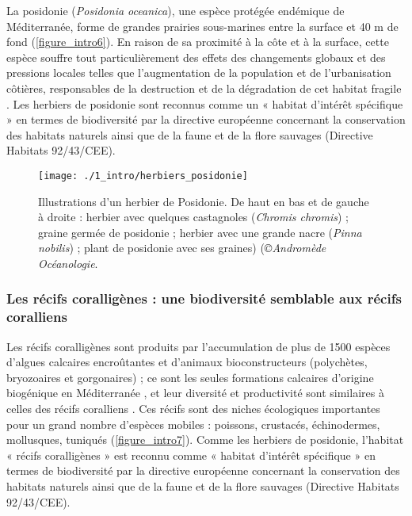 La posidonie (\textit{Posidonia oceanica}), une espèce protégée endémique de Méditerranée, forme de grandes prairies sous-marines entre la surface et 40 m de fond (\autoref{figure_intro6}). En raison de sa proximité à la côte et à la surface, cette espèce souffre tout particulièrement des effets des changements globaux \citep{marba_mediterranean_2014} et des pressions locales telles que l’augmentation de la population et de l’urbanisation côtières, responsables de la destruction et de la dégradation de cet habitat fragile \citep{montefalcone_human_2010, marba_mediterranean_2014, holon_impact_2015, telesca_seagrass_2015}. Les herbiers de posidonie sont reconnus comme un « habitat d’intérêt spécifique » en termes de biodiversité par la directive européenne concernant la conservation des habitats naturels ainsi que de la faune et de la flore sauvages (Directive Habitats 92/43/CEE).

\begin{figure}[H]
	\begin{center}
	\texttt{[image: ./1\_intro/herbiers\_posidonie]}
		\caption[Illustrations d’un herbier de Posidonie]{Illustrations d’un herbier de Posidonie. De haut en bas et de gauche à droite : herbier avec quelques castagnoles (\textit{Chromis chromis}) ; graine germée de posidonie ; herbier avec une grande nacre (\textit{Pinna nobilis}) ; plant de posidonie avec ses graines) (\textit{©Andromède Océanologie}.}
	\label{figure_intro6}
\end{center}
\end{figure}

\subsubsection{Les récifs coralligènes : une biodiversité semblable aux récifs coralliens}\label{intro.1.3.2}

Les récifs coralligènes sont produits par l’accumulation de plus de 1500 espèces d’algues calcaires encroûtantes et d’animaux bioconstructeurs (polychètes, bryozoaires et gorgonaires) \citep{ballesteros_mediterranean_2006}; ce sont les seules formations calcaires d’origine biogénique en Méditerranée \citep{ballesteros_mediterranean_2006}, et leur diversité et productivité sont similaires à celles des récifs coralliens \citep{bianchi_biocostruzione_2001}. Ces récifs sont des niches écologiques importantes pour un grand nombre d’espèces mobiles : poissons, crustacés, échinodermes, mollusques, tuniqués \citep{ballesteros_mediterranean_2006} (\autoref{figure_intro7}). Comme les herbiers de posidonie, l’habitat « récifs coralligènes » est reconnu comme « habitat d’intérêt spécifique » en termes de biodiversité par la directive européenne concernant la conservation des habitats naturels ainsi que de la faune et de la flore sauvages (Directive Habitats 92/43/CEE).

